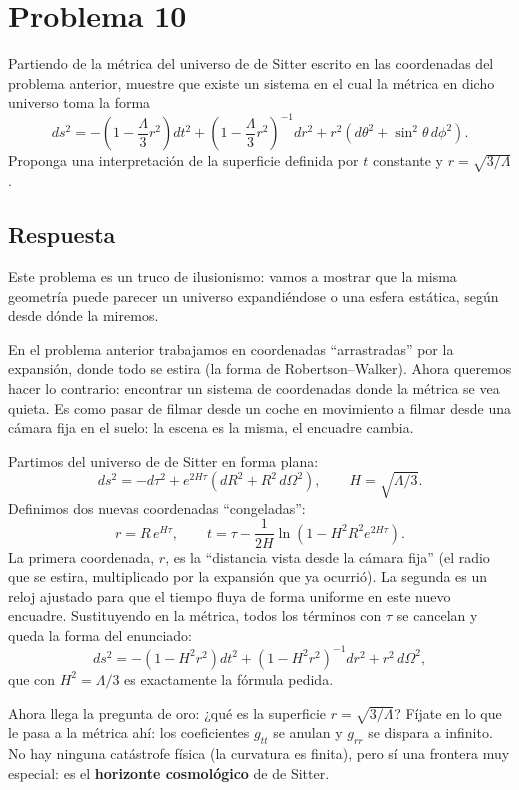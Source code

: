 \documentclass[11pt,a4paper]{article}
\begin{document}
\section*{Problema 10}
Partiendo de la métrica del universo de de Sitter escrito en las coordenadas del problema anterior, muestre que existe un sistema en el cual la métrica en dicho universo toma la forma
\begin{equation}
  ds^2=-\left(1-\frac{\Lambda}{3}r^2\right)dt^2+\left(1-\frac{\Lambda}{3}r^2\right)^{-1}dr^2+r^2\left(d\theta^2+\sin^2\theta\,d\phi^2\right).
\end{equation}
Proponga una interpretación de la superficie definida por $t$ constante y $r=\sqrt{3/\Lambda}$.

\subsection*{Respuesta}

Este problema es un truco de ilusionismo: vamos a mostrar que la misma geometría puede parecer un universo expandiéndose o una esfera estática, según desde dónde la miremos.

En el problema anterior trabajamos en coordenadas ``arrastradas'' por la expansión, donde todo se estira (la forma de Robertson--Walker). Ahora queremos hacer lo contrario: encontrar un sistema de coordenadas donde la métrica se vea quieta. Es como pasar de filmar desde un coche en movimiento a filmar desde una cámara fija en el suelo: la escena es la misma, el encuadre cambia.

Partimos del universo de de Sitter en forma plana:
\[
ds^2 = -d\tau^2 + e^{2H\tau}\left(dR^2 + R^2\,d\Omega^2\right), \qquad H=\sqrt{\Lambda/3}.
\]
Definimos dos nuevas coordenadas ``congeladas'':
\[
r = R\,e^{H\tau}, \qquad t = \tau - \frac{1}{2H}\ln\left(1 - H^2R^2 e^{2H\tau}\right).
\]
La primera coordenada, $r$, es la ``distancia vista desde la cámara fija'' (el radio que se estira, multiplicado por la expansión que ya ocurrió). La segunda es un reloj ajustado para que el tiempo fluya de forma uniforme en este nuevo encuadre. Sustituyendo en la métrica, todos los términos con $\tau$ se cancelan y queda la forma del enunciado:
\[
ds^2 = -\left(1-H^2r^2\right)dt^2 + \left(1-H^2r^2\right)^{-1}dr^2 + r^2\,d\Omega^2,
\]
que con $H^2=\Lambda/3$ es exactamente la fórmula pedida.

Ahora llega la pregunta de oro: ¿qué es la superficie $r=\sqrt{3/\Lambda}$? Fíjate en lo que le pasa a la métrica ahí: los coeficientes $g_{tt}$ se anulan y $g_{rr}$ se dispara a infinito. No hay ninguna catástrofe física (la curvatura es finita), pero sí una frontera muy especial: es el \textbf{horizonte cosmológico} de de Sitter.
\end{document}
